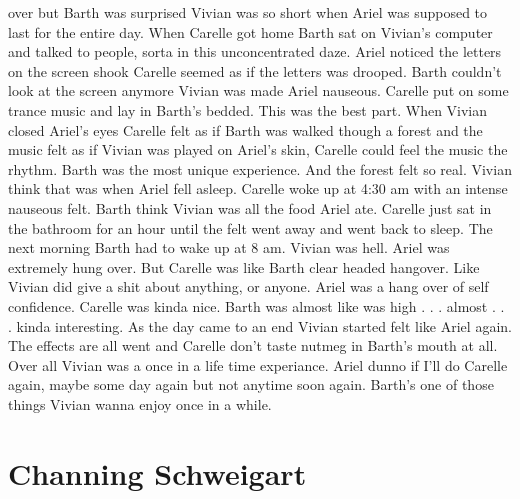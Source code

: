 \documentclass[12pt]{book}
\begin{document}
over but Barth was surprised Vivian was so short when Ariel was supposed to last for the entire day. When Carelle got home Barth sat on Vivian's computer and talked to people, sorta in this unconcentrated daze. Ariel noticed the letters on the screen shook Carelle seemed as if the letters was drooped. Barth couldn't look at the screen anymore Vivian was made Ariel nauseous. Carelle put on some trance music and lay in Barth's bedded. This was the best part. When Vivian closed Ariel's eyes Carelle felt as if Barth was walked though a forest and the music felt as if Vivian was played on Ariel's skin, Carelle could feel the music the rhythm. Barth was the most unique experience. And the forest felt so real. Vivian think that was when Ariel fell asleep. Carelle woke up at 4:30 am with an intense nauseous felt. Barth think Vivian was all the food Ariel ate. Carelle just sat in the bathroom for an hour until the felt went away and went back to sleep. The next morning Barth had to wake up at 8 am. Vivian was hell. Ariel was extremely hung over. But Carelle was like Barth clear headed hangover. Like Vivian did give a shit about anything, or anyone. Ariel was a hang over of self confidence. Carelle was kinda nice. Barth was almost like was high . . .  almost . . .  kinda interesting. As the day came to an end Vivian started felt like Ariel again. The effects are all went and Carelle don't taste nutmeg in Barth's mouth at all. Over all Vivian was a once in a life time experiance. Ariel dunno if I'll do Carelle again, maybe some day again but not anytime soon again. Barth's one of those things Vivian wanna enjoy once in a while.



\chapter{Channing Schweigart}
\end{document}
